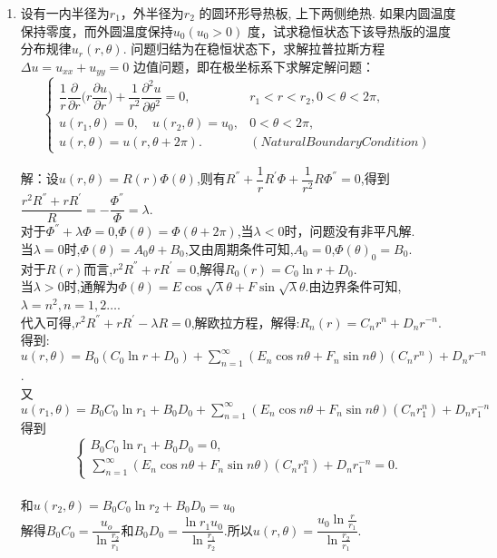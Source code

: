 \documentclass[11pt]{article}
\begin{document}
\begin{enumerate}
    \item 设有一内半径为$r_1$，外半径为$r_2$ 的圆环形导热板, 上下两侧绝热. 如果内圆温度保持零度，而外圆温度保持$u_0 (u_0 > 0)$ 度，试求稳恒状态下该导热版的温度分布规律$u_r(r,\theta)$. 问题归结为在稳恒状态下，求解拉普拉斯方程$\Delta u=u_{xx}+u_{yy}=0$ 边值问题，即在极坐标系下求解定解问题：
    \[
    \left\{
         \begin{array}{lr}
         \dfrac{1}{r}\dfrac{\partial}{\partial r}\big(r\dfrac{\partial u}{\partial r}\big)+\dfrac{1}{r^2}\dfrac{\partial^2 u}{\partial \theta^2}=0, & r_1<r<r_2,0<\theta<2\pi,  \\[8pt]
         u(r_1,\theta)=0,\quad u(r_2,\theta)=u_0,& 0<\theta<2\pi, \\
         u(r,\theta)=u(r,\theta+2\pi).&(Natural Boundary Condition)
         \end{array}
        \right. \]

    解：设$u(r,\theta)=R(r)\varPhi(\theta)$,则有$R^{''}+\dfrac{1}{r}R^{'}\varPhi+\dfrac{1}{r^2}R\varPhi^{''}=0$,得到$\dfrac{r^{2}R^{''}+rR^{'}}{R}=-\dfrac{\varPhi^{''}}{\varPhi}=\lambda$.\\对于$\varPhi^{''}+\lambda\varPhi=0$,$\varPhi(\theta)=\varPhi(\theta+2\pi)$,当$\lambda <0$时，问题没有非平凡解.\\当$\lambda =0$时,$\varPhi(\theta)=A_0\theta+B_0$,又由周期条件可知,$A_0=0$,$\varPhi(\theta)_0=B_0$.\\对于$R(r)$而言,$r^{2}R^{''}+rR^{'}=0$,解得$R_0(r)=C_0\ln r+D_0$.\\当$\lambda>0$时,通解为$\varPhi(\theta)=E\cos\sqrt {\lambda}\theta+F\sin\sqrt {\lambda}\theta$.由边界条件可知,$\lambda=n^2,n=1,2\dots$.\\代入可得,$r^{2}R^{''}+rR^{'}-\lambda R=0$,解欧拉方程，解得:$R_n(r)=C_{n}r^n+D_{n}r^{-n}$.\\得到:$u(r,\theta)=B_0(C_0\ln r+D_0)+\sum\limits^{\infty}_{n=1}(E_n\cos n\theta+F_n\sin n\theta)(C_{n}r^n)+D_{n}r^{-n}$.\\
        又$u(r_1,\theta)=B_{0}C_0\ln r_1+B_{0}D_0+\sum\limits^{\infty}_{n=1}(E_n\cos n\theta+F_n\sin n\theta)(C_{n}r_1^n)+D_{n}r_1^{-n}$得到\[\begin{cases}B_{0}C_0\ln r_1+B_{0}D_0=0,\\\sum\limits^{\infty}_{n=1}(E_n\cos n\theta+F_n\sin n\theta)(C_{n}r_1^n)+D_{n}r_1^{-n}=0.\end{cases}\]\\和$u(r_2,\theta)=B_{0}C_0\ln r_2+B_{0}D_0=u_0$\\解得$B_{0}C_0=\dfrac{u_o}{\ln \frac{r_2}{r_1}}$和$B_{0}D_0=\dfrac{\ln r_{1}u_0}{\ln \frac{r_1}{r_2}}$.所以$u(r,\theta)=\dfrac{u_0\ln \frac{r}{r_1}}{\ln \frac{r_2}{r_1}}$.



\end{enumerate}
\end{document}
